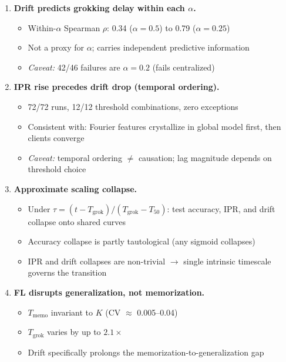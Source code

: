 \documentclass[11pt]{article}
\begin{document}
\begin{enumerate}
  \item \textbf{Drift predicts grokking delay within each $\alpha$.}
  \begin{itemize}
    \item Within-$\alpha$ Spearman $\rho$: 0.34 ($\alpha{=}0.5$) to
          0.79 ($\alpha{=}0.25$)
    \item Not a proxy for $\alpha$; carries independent predictive information
    \item \emph{Caveat:} 42/46 failures are $\alpha{=}0.2$ (fails centralized)
  \end{itemize}

  \item \textbf{IPR rise precedes drift drop (temporal ordering).}
  \begin{itemize}
    \item 72/72 runs, 12/12 threshold combinations, zero exceptions
    \item Consistent with: Fourier features crystallize in global model first,
          then clients converge
    \item \emph{Caveat:} temporal ordering $\neq$ causation; lag magnitude
          depends on threshold choice
  \end{itemize}

  \item \textbf{Approximate scaling collapse.}
  \begin{itemize}
    \item Under $\tau = (t - T_{\mathrm{grok}})/(T_{\mathrm{grok}} - T_{50})$:
          test accuracy, IPR, and drift collapse onto shared curves
    \item Accuracy collapse is partly tautological (any sigmoid collapses)
    \item IPR and drift collapses are non-trivial $\to$ single intrinsic
          timescale governs the transition
  \end{itemize}

  \item \textbf{FL disrupts generalization, not memorization.}
  \begin{itemize}
    \item $T_{\mathrm{memo}}$ invariant to $K$ (CV $\approx$ 0.005--0.04)
    \item $T_{\mathrm{grok}}$ varies by up to $2.1\times$
    \item Drift specifically prolongs the memorization-to-generalization gap
  \end{itemize}
\end{enumerate}
\end{document}
